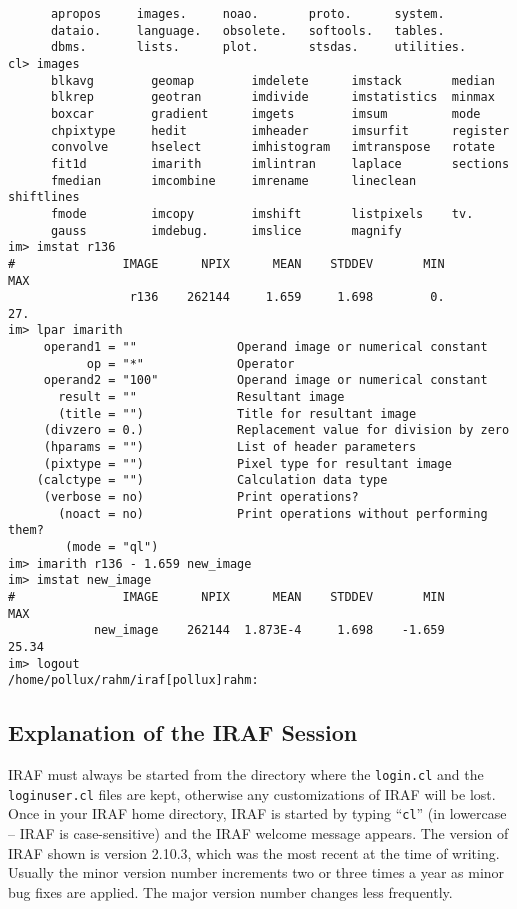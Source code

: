 {\begin{verbatim}
      apropos     images.     noao.       proto.      system.
      dataio.     language.   obsolete.   softools.   tables.
      dbms.       lists.      plot.       stsdas.     utilities.
cl> images
      blkavg        geomap        imdelete      imstack       median
      blkrep        geotran       imdivide      imstatistics  minmax
      boxcar        gradient      imgets        imsum         mode
      chpixtype     hedit         imheader      imsurfit      register
      convolve      hselect       imhistogram   imtranspose   rotate
      fit1d         imarith       imlintran     laplace       sections
      fmedian       imcombine     imrename      lineclean     shiftlines
      fmode         imcopy        imshift       listpixels    tv.
      gauss         imdebug.      imslice       magnify
im> imstat r136
#               IMAGE      NPIX      MEAN    STDDEV       MIN       MAX
                 r136    262144     1.659     1.698        0.       27.
im> lpar imarith
     operand1 = ""              Operand image or numerical constant
           op = "*"             Operator
     operand2 = "100"           Operand image or numerical constant
       result = ""              Resultant image
       (title = "")             Title for resultant image
     (divzero = 0.)             Replacement value for division by zero
     (hparams = "")             List of header parameters
     (pixtype = "")             Pixel type for resultant image
    (calctype = "")             Calculation data type
     (verbose = no)             Print operations?
       (noact = no)             Print operations without performing them?
        (mode = "ql")
im> imarith r136 - 1.659 new_image
im> imstat new_image
#               IMAGE      NPIX      MEAN    STDDEV       MIN       MAX
            new_image    262144  1.873E-4     1.698    -1.659     25.34
im> logout
/home/pollux/rahm/iraf[pollux]rahm:
\end{verbatim}
}
\newpage
\subsection{Explanation of the IRAF Session}

IRAF must always be started from the directory
where the {\tt login.cl} and the {\tt loginuser.cl} files are
kept, otherwise any customizations of IRAF will be lost. Once in your
IRAF home directory, IRAF is started by typing ``{\tt cl}'' (in
lowercase -- IRAF is case-sensitive) and the
IRAF welcome message appears. The version of IRAF shown is version
2.10.3, which was the most recent at the time of writing. Usually the
minor version number increments two or three times a year as minor bug
fixes are applied. The major version number changes less frequently.


